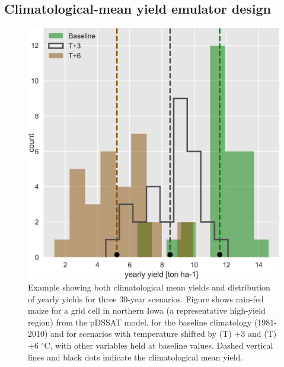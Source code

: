 \documentclass[preprint, 5p, times, twocolumn]{elsarticle}
\begin{document}
\subsection{Climatological-mean yield emulator design}
\begin{figure}[!h]
\centering
   \includegraphics[width=0.95\linewidth]{figures/hist_year.png}
   \caption{Example showing both climatological mean yields and distribution of yearly yields for three 30-year scenarios. Figure shows rain-fed maize for a grid cell in northern Iowa (a representative high-yield region) from the pDSSAT model, for the baseline climatology (1981-2010) and for scenarios with temperature shifted by (T) +3 and (T) +6 $^{\circ}$C, with other variables held at baseline values. Dashed vertical lines and black dots indicate the climatological mean yield.}
   \label{fig:yearly}
\end{figure}
\end{document}
